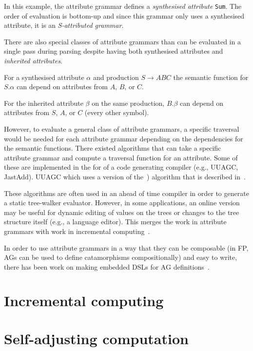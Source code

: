 \documentclass{article}
\theoremstyle{definition}
\newif\ifusenatbib
\begin{document}
In this example, the attribute grammar defines a \emph{synthesised
attribute} \texttt{Sum}. The order of evaluation is bottom-up and
since this grammar only uses a synthesised attribute, it is an
\emph{S-attributed grammar}.

There are also special classes of attribute grammars than can be
evaluated in a single pass during parsing despite having both
synthesised attributes and \emph{inherited attributes}.

For a synthesised attribute \(\alpha\) and production \( S \to ABC
\) the semantic function for \(S.\alpha\) can depend on attributes
from \(A\), \(B\), or \(C\).

For the inherited attribute \(\beta\) on the same production,
\(B.\beta\) can depend on attributes from \(S\), \(A\), or \(C\)
(every other symbol).

However, to evaluate a general class of attribute grammars, a
specific traversal would be needed for each attribute grammar
depending on the dependencies for the semantic functions. There
existed algorithms that can take a specific attribute grammar and
compute a traversal function for an attribute. Some of these are
implemented in the for of a code generating compiler (e.g., UUAGC,
JastAdd). UUAGC which uses a version of
the~\cite{kennedy1976automatic}) algorithm that is described
in~\cite{bransen2012kennedy}.

These algorithms are often used in an ahead of time compiler in
order to generate a static tree-walker evaluator. However, in some
applications, an online version may be useful for dynamic editing
of values on the trees or changes to the tree structure itself
(e.g., a language editor). This merges the work in attribute
grammars with work in incremental
computing~\cite{reps1983incremental,ramalingam1993categorized}.

In order to use attribute grammars in a way that they can be
composable (in FP, AGs can be used to define catamorphisms
compositionally) and easy to write, there has been work on making
embedded DSLs for AG definitions~\cite{sloane2010pure}.


\section{Incremental computing}

\section{Self-adjusting computation}


\ifusenatbib
	
\else
	\printbibliography
\fi
\end{document}
